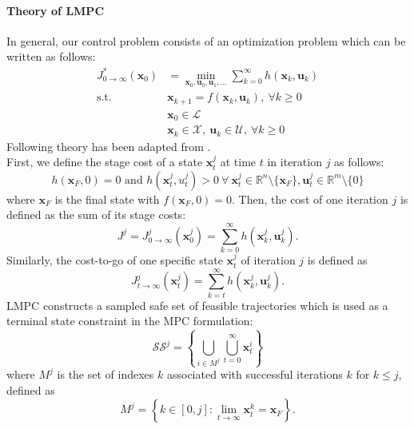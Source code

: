 \paragraph{Theory of LMPC}
In general, our control problem consists of an optimization problem which can be written as follows:
\begin{subequations}\label{eq:generalProblem}
\begin{align}
J_{0\rightarrow \infty}^*(\bm{x}_0)&=\min_{\bm{x}_0,\bm{u}_0,\bm{u}_1,\ldots} \sum\limits_{k=0}^{\infty} h(\bm{x}_k,\bm{u}_k)\\
\textrm{s.t. }
&\bm{x}_{k+1}=f(\bm{x}_k,\bm{u}_k),~\forall k\geq 0 \\
&\bm{x}_0 \in \mathcal{L} \\
&\bm{x}_k \in \mathcal{X},~\bm{u}_k \in \mathcal{U},~\forall k\geq 0
\end{align}
\end{subequations}
Following theory has been adapted from \cite{Rosolia2016}.\\
First, we define the stage cost of a state $\bm{x}_t^j$ at time $t$ in iteration $j$ as follows:
\begin{equation}\label{eq:iterationCost}
h(\bm{x}_F,0)=0\text{ and } h(\bm{x}_t^j,u_t^j)>0\ \forall\ \bm{x}_t^j\in\mathbb{R}^n\setminus \{\bm{x}_F\},\bm{u}_t^j\in\mathbb{R}^m\setminus\{0\}
\end{equation}
where $\bm{x}_F$ is the final state with $f(\bm{x}_F,0)=0$.
Then, the cost of one iteration $j$ is defined as the sum of its stage costs:
\begin{equation}
J^j = J_{0\rightarrow\infty}^j(\bm{x}_0^j)=\sum_{k=0}^\infty h(\bm{x}_k^j,\bm{u}_k^j).
\end{equation}
Similarly, the cost-to-go of one specific state $\bm{x}_t^j$ of iteration $j$ is defined as
\begin{equation}\label{eq:LMPC_costToGo}
J_{t\rightarrow\infty}^j(\bm{x}_t^j)=\sum_{k=t}^\infty h(\bm{x}_k^j,\bm{u}_k^j).
\end{equation}
LMPC constructs a sampled safe set of feasible trajectories which is used as a terminal state constraint in the MPC formulation:
\begin{equation}
\mathcal{SS}^j = \left\{ \bigcup_{i\in M^j} \bigcup_{t=0}^\infty \bm{x}_t^i\right\}
\end{equation}
where $M^j$ is the set of indexes $k$ associated with successful iterations $k$ for $k \leq j$, defined as
\begin{equation}
M^j=\left\{ k\in [0,j]: \lim_{t\rightarrow\infty}\bm{x}_t^k=\bm{x}_F\right\}.
\end{equation}
